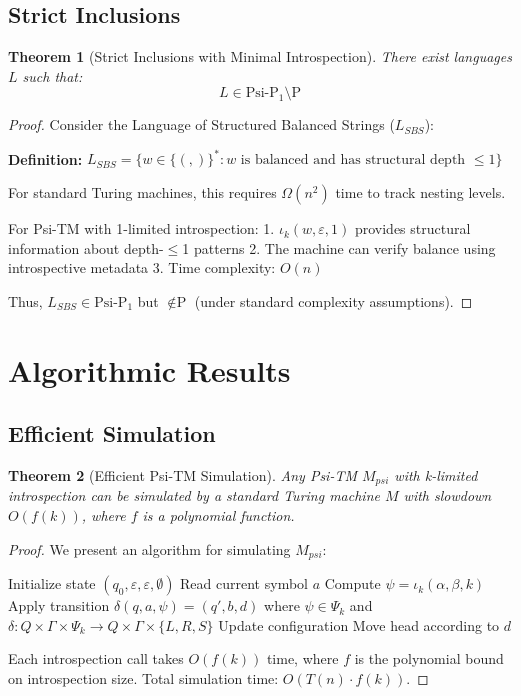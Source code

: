 \documentclass[11pt]{article}
\newtheorem{theorem}{Theorem}
\begin{document}
\subsection{Strict Inclusions}

\begin{theorem}[Strict Inclusions with Minimal Introspection]
There exist languages $L$ such that:
$$L \in \text{Psi-P}_1 \setminus \text{P}$$
\end{theorem}

\begin{proof}
Consider the Language of Structured Balanced Strings ($L_{SBS}$):

\textbf{Definition:} $L_{SBS} = \{w \in \{(,)\}^* : w \text{ is balanced and has structural depth } \leq 1\}$

For standard Turing machines, this requires $\Omega(n^2)$ time to track nesting levels.

For Psi-TM with 1-limited introspection:
1. $\iota_k(w, \varepsilon, 1)$ provides structural information about depth-$\leq$1 patterns
2. The machine can verify balance using introspective metadata
3. Time complexity: $O(n)$

Thus, $L_{SBS} \in \text{Psi-P}_1$ but $\notin \text{P}$ (under standard complexity assumptions).
\end{proof}

\section{Algorithmic Results}

\subsection{Efficient Simulation}

\begin{theorem}[Efficient Psi-TM Simulation]
Any Psi-TM $M_{psi}$ with k-limited introspection can be simulated by a standard Turing machine $M$ with slowdown $O(f(k))$, where $f$ is a polynomial function.
\end{theorem}

\begin{proof}
We present an algorithm for simulating $M_{psi}$:

\begin{algorithm}
\caption{Psi-TM Simulation}
\begin{algorithmic}
\STATE Initialize state $(q_0, \varepsilon, \varepsilon, \emptyset)$
    \STATE Read current symbol $a$
    \STATE Compute $\psi = \iota_k(\alpha, \beta, k)$
    \STATE Apply transition $\delta(q, a, \psi) = (q', b, d)$ where $\psi \in \Psi_k$ and $\delta: Q \times \Gamma \times \Psi_k \to Q \times \Gamma \times \{L, R, S\}$
    \STATE Update configuration
    \STATE Move head according to $d$
\ENDWHILE
\end{algorithmic}
\end{algorithm}

Each introspection call takes $O(f(k))$ time, where $f$ is the polynomial bound on introspection size. Total simulation time: $O(T(n) \cdot f(k))$.
\end{proof}
\end{document}
